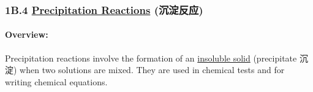 
\subsubsection{1B.4 \underline{Precipitation Reactions} (沉淀反应)}
\paragraph{Overview:} Precipitation reactions involve the formation of an \underline{insoluble solid} (precipitate 沉淀) when two
solutions are mixed. They are used in chemical tests and for writing chemical equations.

